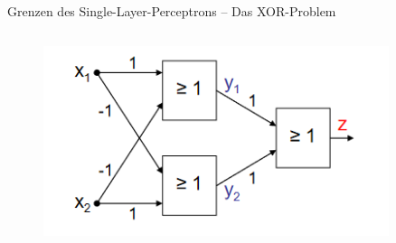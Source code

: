 \documentclass[aspectratio=1610, xcolor=dvipsnames, 9pt]{beamer}
\begin{document}
\begin{frame}{Grenzen des Single-Layer-Perceptrons -- Das XOR-Problem}
\begin{columns}
    \begin{column}{0.4\textwidth}
      \begin{figure}
        \centering
                    \includegraphics[width=0.9\textwidth]{images/XOR.png}
        \end{figure}
    \end{column}
  \end{columns}
\end{frame}
\end{document}
